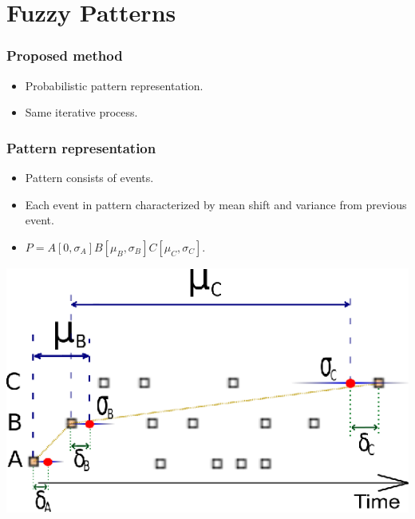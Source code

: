 \documentclass[smaller]{beamer}
\begin{document}

\section{Fuzzy Patterns}
\begin{frame}
  \frametitle{Proposed method}
\begin{itemize}
  \item Probabilistic pattern representation.
  \item Same iterative process.
\end{itemize}
\end{frame}

\begin{frame}
  \frametitle{Pattern representation }
\begin{itemize}
  \item Pattern consists of events.
  \item Each event in pattern characterized by mean shift and variance from 
	previous event.
  \item $P=A[0,\sigma_A]B[\mu_B,\sigma_B]C[\mu_C,\sigma_C]$.
\end{itemize}
\begin{center}
\includegraphics[scale=0.9]{il1.eps}
\end{center}

\end{frame}
\end{document}
